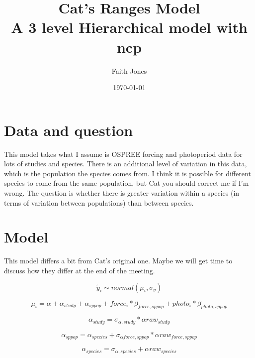 \documentclass[11pt,letter]{article}
\title{Cat's Ranges Model \\ A 3 level Hierarchical model with ncp}
\date{\today}
\author{Faith Jones}
\begin{document}
\renewcommand{\bibname}{References}%


\maketitle{}
\tableofcontents

\section{Data and question}
This model takes what I assume is OSPREE forcing and photoperiod data for lots of studies and species. There is an additional level of variation in this data, which is the population the species comes from. I think it is possible for different species to come from the same population, but Cat you should correct me if I'm wrong. The question is whether there is greater variation within a species (in terms of variation between populations) than between species. 

\section{Model}

This model differs a bit from Cat's original one. Maybe we will get time to discuss how they differ at the end of the meeting. 


\begin{equation}
\tilde{y}_{i}\sim normal(\mu_{i},\sigma_{y})
\end{equation}

\begin{equation}
\mu_{i} = \alpha + \alpha_{study} + \alpha_{sppop} + force_{i} * \beta _{force,sppop} + photo_{i} * \beta _{photo,sppop} 
\end{equation}

\begin{equation}
\alpha_{study} =  \sigma_{\alpha, study} * \alpha raw_{study}
\end{equation}

\begin{equation}
\alpha_{sppop} = \alpha_{species}  + \sigma_{\alpha force,sppop} * \alpha raw_{force,sppop}
\end{equation}

\begin{equation}
\alpha_{species} = \sigma_{\alpha, species} + \alpha raw_{species}
\end{equation}
\end{document}
